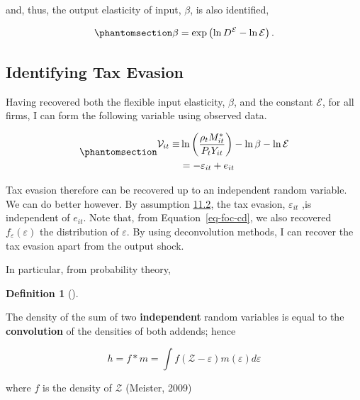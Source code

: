 \documentclass[
  12pt]{article}
\theoremstyle{definition}
\newtheorem{definition}{Definition}[section]
\theoremstyle{remark}
\newenvironment{fbx}[3]{\begin{tcolorbox}[enhanced, breakable,%
attach boxed title to top*={xshift=1.4pt},
boxed title style={boxrule=0.0mm, fuzzy shadow={1pt}{-1pt}{0mm}{0.1mm}{gray}, arc=.3em, rounded corners=east, sharp corners=west}, colframe=#1-color2, colbacktitle=#1-color1, colback = white, coltitle=black,  titlerule=0mm, toprule=0pt, bottomrule=.7pt, leftrule=.3em, rightrule=0pt, outer arc=.3em,  arc=0pt,	 sharp corners = east, left=.5em, bottomtitle=1mm, toptitle=1mm,title=\textbf{#2}\hspace{0.5em}{#3}]}
{\end{tcolorbox}}
\begin{document}
and, thus, the output elasticity of input, \(\beta\), is also
identified,

\begin{equation}\phantomsection\label{eq-id-beta}{
\beta=\exp\left(\ln D^{\mathcal{E}}-\ln\mathcal{E}\right).
}\end{equation}

\subsection{Identifying Tax Evasion}\label{identifying-tax-evasion}

Having recovered both the flexible input elasticity, \(\beta\), and the
constant \(\mathcal{E}\), for all firms, I can form the following
variable using observed data.

\begin{equation}\phantomsection\label{eq-ob-ev}{
\begin{aligned}
    \mathcal V_{it}\equiv&\ln\left(\frac{\rho_t M^*_{it}}{P_{t}Y_{it}}\right)-\ln\beta -\ln\mathcal{E}\notag \\
    &=-\varepsilon_{it} +e_{it}
\end{aligned}
}\end{equation}

Tax evasion therefore can be recovered up to an independent random
variable. We can do better however. By assumption
\hyperref[ass-ind]{11.2}, the tax evasion, \(\varepsilon_{it}\) ,is
independent of \(e_{it}\). Note that, from Equation~\ref{eq-foc-cd}, we
also recovered \(f_{\varepsilon}(\varepsilon)\) the distribution of
\(\varepsilon\). By using deconvolution methods, I can recover the tax
evasion apart from the output shock.

In particular, from probability theory,

\begin{definition}[]\protect\hypertarget{def-conv}{}\label{def-conv}

\begin{fbx}{Definition}{Definition: }{Convolution}
\label{}
The density of the sum of two \textbf{independent} random variables is
equal to the \textbf{convolution} of the densities of both addends;
hence

\[
h = f*m = \int f(\mathcal Z - \varepsilon)m(\varepsilon)d\varepsilon
\]

where \(f\) is the density of \(\mathcal Z\) (Meister, 2009)

\end{fbx}

\end{definition}
\end{document}
